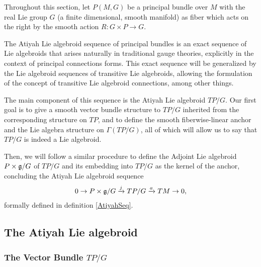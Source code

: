Throughout this section, let $P(M, G)$ be a principal bundle over $M$ with the real Lie group $G$ (a finite dimensional, smooth manifold) as fiber which acts on the right by the smooth action $R: G \times P \to G$.

The Atiyah Lie algebroid sequence of principal bundles is an exact sequence of Lie algebroids that arises naturally in traditional gauge theories, explicitly in the context of principal connections forms. This exact sequence will be generalized by the Lie algebroid sequences of transitive Lie algebroids, allowing the formulation of the concept of transitive Lie algebroid connections, among other things.

The main component of this sequence is the Atiyah Lie algebroid $TP/G$. Our first goal is to give a smooth vector bundle structure to $TP/G$ inherited from the corresponding structure on $TP$, and to define the smooth fiberwise-linear anchor and the Lie algebra structure on $\Gamma(TP/G)$, all of which will allow us to say that $TP/G$ is indeed a Lie algebroid.

Then, we will follow a similar procedure to define the Adjoint Lie algebroid $P \times \mathfrak{g}/G$ of $TP/G$ and its embedding into $TP/G$ as the kernel of the anchor, concluding the Atiyah Lie algebroid sequence
\begin{align*}
    0 \to P \times \mathfrak{g}/G \xrightarrow{j} TP/G \xrightarrow{a} TM \to 0,
\end{align*}
formally defined in definition \ref{AtiyahSeq}.

\subsection{The Atiyah Lie algebroid}

\subsubsection{The Vector Bundle $TP/G$}

